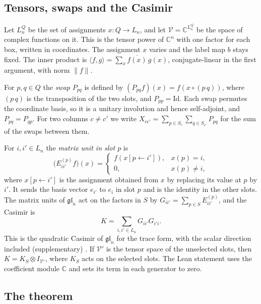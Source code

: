 \documentclass[11pt]{amsart}
\newcommand{\notlean}{supplementary}
\theoremstyle{definition}
\theoremstyle{remark}
\begin{document}
\subsection{Tensors, swaps and the Casimir}\label{sec:operators}

Let \(L_n^Q\) be the set of assignments \(x:Q\to L_n\), and let
\(\mathcal V=\mathbb C^{L_n^Q}\) be the space of complex functions on it. This
is the tensor power of \(\mathbb C^n\) with one factor for each box, written
in coordinates. The assignment \(x\) varies and the label map \(b\) stays
fixed. The inner product is
\(\langle f,g\rangle=\sum_{x}\overline{f(x)}\,g(x)\), conjugate-linear in the
first argument, with norm \(\|f\|\).

For \(p,q\in Q\) the \emph{swap} \(P_{pq}\) is defined by
\((P_{pq}f)(x)=f(x\circ(p\,q))\), where \((p\,q)\) is the transposition of the
two slots, and \(P_{pp}=\mathrm{Id}\). Each swap permutes the coordinate
basis, so it is a unitary involution and hence self-adjoint, and
\(P_{pq}=P_{qp}\). For two columns \(c\ne c'\) we write
\(X_{cc'}=\sum_{p\in S_c}\sum_{q\in S_{c'}}P_{pq}\) for the sum of the swaps
between them.

For \(i,i'\in L_n\) the \emph{matrix unit in slot \(p\)} is
\[
\bigl(E^{(p)}_{ii'}f\bigr)(x)=
\begin{cases}
f(x[p\leftarrow i']),&x(p)=i,\\
0,&x(p)\ne i,
\end{cases}
\]
where \(x[p\leftarrow i']\) is the assignment obtained from \(x\) by replacing
its value at \(p\) by \(i'\). It sends the basis vector \(e_{i'}\) to \(e_i\)
in slot \(p\) and is the identity in the other slots. The matrix units of
\(\mathfrak{gl}_n\) act on the factors in \(S\) by
\(G_{ii'}=\sum_{p\in S}E^{(p)}_{ii'}\), and the Casimir is
\[
K=\sum_{i,i'\in L_n}G_{ii'}G_{i'i}.
\]
This is the quadratic Casimir of \(\mathfrak{gl}_n\) for the trace form, with
the scalar direction included (\notlean) \cite[Example~5.4]{Yang}. If \(\mathcal V'\) is the tensor space of the unselected slots, then
\(K=K_S\otimes I_{\mathcal V'}\), where \(K_S\) acts on the selected slots.
The Lean statement uses the coefficient module \(\mathbb C\) and sets its
term in each generator to zero.

\subsection{The theorem}
\end{document}
